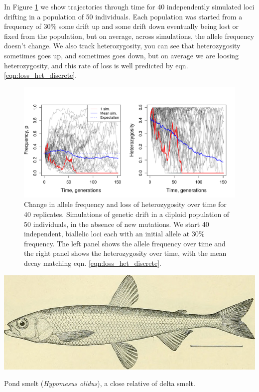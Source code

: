 In Figure \ref{fig:LossHet_WF_N50} we show trajectories through time for 40 independently simulated loci drifting in a population of 50 individuals. Each population was started from a frequency of $30\%$ some drift up and some drift down eventually being lost or fixed from the population, but on average, across simulations, the allele frequency doesn't change. We also track heterozygosity, you can see that heterozygosity sometimes goes up, and sometimes goes down, but on average we are loosing heterozygosity, and this rate of loss is well predicted by eqn. \eqref{eqn:loss_het_discrete}. 
\begin{figure}
\begin{center}
\includegraphics[width= \textwidth]{figures/WF_loss_het/WF_loss_het_N50.pdf}
\end{center}
\caption{Change in allele frequency and loss of heterozygosity over time for 40 replicates. Simulations of genetic drift in a diploid population of 50 individuals, in the absence of new mutations. We start 40 independent, biallelic loci each with an initial allele at 30\% frequency. The left panel shows the allele frequency over time and the right panel shows the heterozygosity over time, with the mean decay matching eqn. \eqref{eqn:loss_het_discrete}. } \label{fig:LossHet_WF_N50}
\end{figure} 


\begin{marginfigure}
\begin{center}
\includegraphics[width= \textwidth]{illustration_images/Genetic_drift/smelt/20497452375_9be855d9ff_z.jpg}
\end{center}
\caption{Pond smelt ({\it Hypomesus olidus}), a close relative of delta smelt. } \label{fig:smelt}
\end{marginfigure} 

